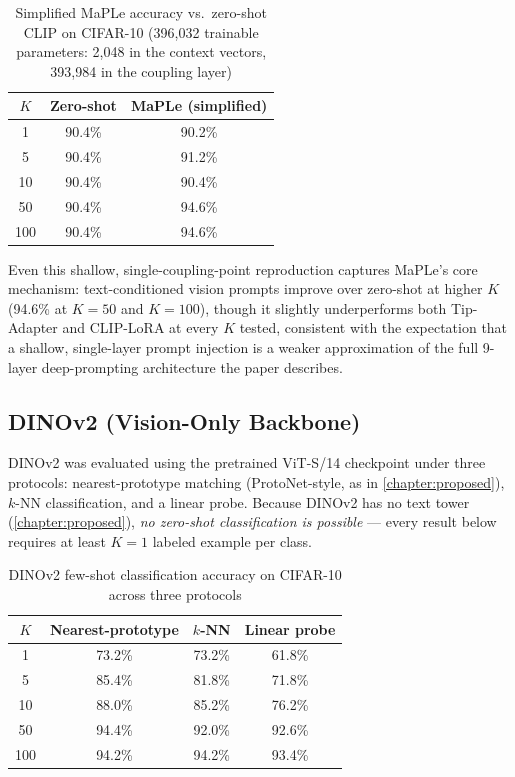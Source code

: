 \documentclass{iutbscthesis}
\begin{document}
\begin{table}[H]
    \centering
    \begin{tabular}{c c c}
        \toprule
        \textbf{$K$} & \textbf{Zero-shot} & \textbf{MaPLe (simplified)} \\
        \midrule
        1   & 90.4\% & 90.2\% \\
        5   & 90.4\% & 91.2\% \\
        10  & 90.4\% & 90.4\% \\
        50  & 90.4\% & 94.6\% \\
        100 & 90.4\% & 94.6\% \\
        \bottomrule
    \end{tabular}
    \caption{Simplified MaPLe accuracy vs.\ zero-shot CLIP on CIFAR-10 (396{,}032 trainable parameters: 2{,}048 in the context vectors, 393{,}984 in the coupling layer)}
    \label{tab:maple}
\end{table}

Even this shallow, single-coupling-point reproduction captures MaPLe's core mechanism: text-conditioned vision prompts improve over zero-shot at higher $K$ (94.6\% at $K=50$ and $K=100$), though it slightly underperforms both Tip-Adapter and CLIP-LoRA at every $K$ tested, consistent with the expectation that a shallow, single-layer prompt injection is a weaker approximation of the full 9-layer deep-prompting architecture the paper describes.

\subsection{DINOv2 (Vision-Only Backbone)} \label{subsec:dinov2results}

DINOv2 \cite{oquab2024dinov2} was evaluated using the pretrained ViT-S/14 checkpoint under three protocols: nearest-prototype matching (ProtoNet-style, as in \autoref{chapter:proposed}), $k$-NN classification, and a linear probe. Because DINOv2 has no text tower (\autoref{chapter:proposed}), \emph{no zero-shot classification is possible} --- every result below requires at least $K=1$ labeled example per class.

\begin{table}[H]
    \centering
    \begin{tabular}{c c c c}
        \toprule
        \textbf{$K$} & \textbf{Nearest-prototype} & \textbf{$k$-NN} & \textbf{Linear probe} \\
        \midrule
        1   & 73.2\% & 73.2\% & 61.8\% \\
        5   & 85.4\% & 81.8\% & 71.8\% \\
        10  & 88.0\% & 85.2\% & 76.2\% \\
        50  & 94.4\% & 92.0\% & 92.6\% \\
        100 & 94.2\% & 94.2\% & 93.4\% \\
        \bottomrule
    \end{tabular}
    \caption{DINOv2 few-shot classification accuracy on CIFAR-10 across three protocols}
    \label{tab:dinov2}
\end{table}
\end{document}
